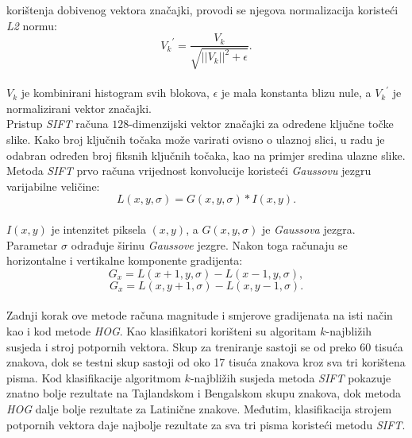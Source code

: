 korištenja dobivenog vektora značajki, provodi se njegova normalizacija koristeći \emph{L2} normu:\\
\begin{equation*}
{V_k}
    ^{'} = \frac{V_k}{\sqrt{{||V_k||}^2 + \epsilon}}.
\end{equation*}
\\
$V_k$ je kombinirani histogram svih blokova, $\epsilon$ je mala konstanta blizu nule, a ${V_k}^{'}$ je normalizirani
vektor značajki.\\
Pristup \emph{SIFT} računa $128$-dimenzijski vektor značajki za određene ključne točke slike. Kako broj ključnih točaka
može varirati ovisno o ulaznoj slici, u radu je odabran određen broj fiksnih ključnih točaka, kao na primjer sredina
ulazne slike. Metoda \emph{SIFT} prvo računa vrijednost konvolucije koristeći \emph{Gaussovu} jezgru varijabilne
veličine:\\
\begin{equation*}
    L(x, y, \sigma) = G(x, y, \sigma) * I(x, y).
\end{equation*}
\\
$I(x, y)$ je intenzitet piksela $(x, y)$, a $G(x, y, \sigma)$ je \emph{Gaussova} jezgra. Parametar $\sigma$ odrađuje
širinu \emph{Gaussove} jezgre. Nakon toga računaju se horizontalne i vertikalne komponente gradijenta:\\
\begin{equation*}
    G_x = L(x + 1, y, \sigma) - L(x - 1, y, \sigma),
\end{equation*}
\begin{equation*}
    G_x = L(x, y + 1, \sigma) - L(x, y - 1, \sigma).
\end{equation*}
\\
Zadnji korak ove metode računa magnitude i smjerove gradijenata na isti način kao i kod metode \emph{HOG}. Kao
klasifikatori korišteni su algoritam $k$-najbližih susjeda i stroj potpornih vektora. Skup za treniranje sastoji se od
preko 60 tisuća znakova, dok se testni skup sastoji od oko 17 tisuća znakova kroz sva tri korištena pisma. Kod
klasifikacije algoritmom $k$-najbližih susjeda metoda \emph{SIFT} pokazuje znatno bolje rezultate na Tajlandskom i
Bengalskom skupu znakova, dok metoda \emph{HOG} dalje bolje rezultate za Latinične znakove. Međutim, klasifikacija
strojem potpornih vektora daje najbolje rezultate za sva tri pisma koristeći metodu \emph{SIFT}.

